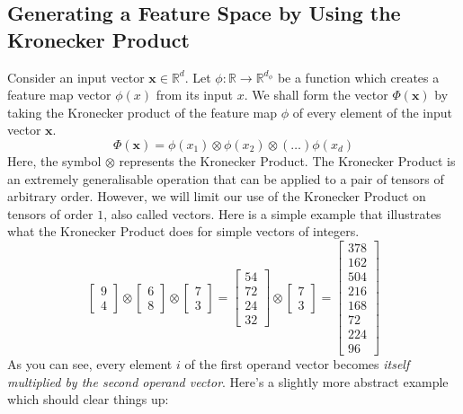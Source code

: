 \documentclass{article}
\theoremstyle{definition}
\theoremstyle{definition}
\begin{document}
\subsection{Generating a Feature Space by Using the Kronecker Product}
Consider an input vector $\mathbf{x} \in \mathbb{R}^d$. Let $\phi : \mathbb{R} \to \mathbb{R}^{d_{\phi}}$ be a function which creates a feature map vector $\phi(x)$ from its input $x$.  We shall form the vector $\Phi(\mathbf{x})$ by taking the Kronecker product of the feature map $\phi$ of every element of the input vector $\mathbf{x}$.
\begin{equation}
    \Phi(\mathbf{x}) = \phi(x_1) \otimes  \phi(x_2) 
                \otimes (\dots) \phi(x_d)
\end{equation}
Here, the symbol $\otimes$ represents the Kronecker Product. The Kronecker Product is an extremely generalisable operation that can be applied to a pair of tensors of arbitrary order. However, we will limit our use of the Kronecker Product on tensors of order $1$, also called vectors. Here is a simple example that illustrates what the Kronecker Product does for simple vectors of integers.
\[
\begin{bmatrix}
    9 \\ 4
\end{bmatrix}
\otimes
\begin{bmatrix}
    6 \\ 8
\end{bmatrix}
\otimes
\begin{bmatrix}
    7 \\ 3
\end{bmatrix}
=
\begin{bmatrix}
    54 \\ 72 \\ 24 \\ 32
\end{bmatrix}
\otimes
\begin{bmatrix}
    7 \\ 3
\end{bmatrix}
=
\begin{bmatrix}
    378 \\ 162\\ 504 \\216\\ 168\\ 72\\ 224\\ 96
\end{bmatrix}
\]
As you can see, every element $i$ of the first operand vector becomes \emph{itself multiplied by the second operand vector}. Here's a slightly more abstract example which should clear things up:
\end{document}
